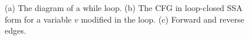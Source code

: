 


\begin{figure}%
\caption{(a) The diagram of a while loop. (b) The CFG in loop-closed SSA form for a variable $v$ modified in the loop. (c) Forward and reverse edges.}
\label{fig:loop_example}
\end{figure}

